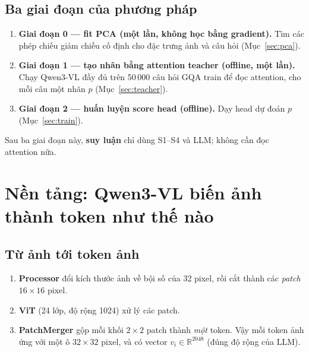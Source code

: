 \documentclass[11pt,a4paper]{article}
\newcommand{\R}{\mathbb{R}}
\begin{document}
\subsection{Ba giai đoạn của phương pháp}
\begin{enumerate}[leftmargin=*]
\item \textbf{Giai đoạn 0 --- fit PCA (một lần, không học bằng gradient).} Tìm các phép chiếu giảm chiều cố định cho đặc trưng ảnh và câu hỏi (Mục~\ref{sec:pca}).
\item \textbf{Giai đoạn 1 --- tạo nhãn bằng attention teacher (offline, một lần).} Chạy Qwen3-VL đầy đủ trên 50\,000 câu hỏi GQA train để đọc attention, cho mỗi câu một nhãn $p$ (Mục~\ref{sec:teacher}).
\item \textbf{Giai đoạn 2 --- huấn luyện score head (offline).} Dạy head dự đoán $p$ (Mục~\ref{sec:train}).
\end{enumerate}
Sau ba giai đoạn này, \textbf{suy luận} chỉ dùng S1--S4 và LLM; không cần đọc attention nữa.

\section{Nền tảng: Qwen3-VL biến ảnh thành token như thế nào}
\label{sec:qwen}

\subsection{Từ ảnh tới token ảnh}
\begin{enumerate}[leftmargin=*]
\item \textbf{Processor} đổi kích thước ảnh về bội số của 32 pixel, rồi cắt thành các \emph{patch} $16\times16$ pixel.
\item \textbf{ViT} (24 lớp, độ rộng 1024) xử lý các patch.
\item \textbf{PatchMerger} gộp mỗi khối $2\times2$ patch thành \emph{một} token. Vậy mỗi token ảnh ứng với một ô $32\times32$ pixel, và có vector $v_i\in\R^{2048}$ (đúng độ rộng của LLM).
\end{enumerate}
\end{document}
